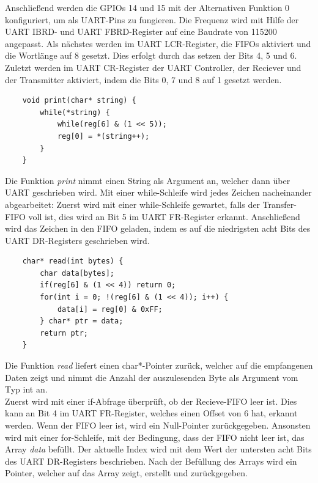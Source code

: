 \documentclass[12pt]{article}
\begin{document}
 Anschließend werden die GPIOs 14 und 15 mit der Alternativen Funktion 0 konfiguriert, um als UART-Pins zu fungieren. Die Frequenz wird mit Hilfe der UART IBRD- und UART FBRD-Register auf eine Baudrate von 115200 angepasst. Als nächstes werden im UART LCR-Register, die FIFOs aktiviert und die Wortlänge auf 8 gesetzt. Dies erfolgt durch das setzen der Bits 4, 5 und 6. Zuletzt werden im UART CR-Register der UART Controller, der Reciever und der Transmitter aktiviert, indem die Bits 0, 7 und 8 auf 1 gesetzt werden.\\
\begin{verbatim}
    void print(char* string) {
        while(*string) {
            while(reg[6] & (1 << 5));
            reg[0] = *(string++);
        }
    }
\end{verbatim}
\vspace{-2mm}
Die Funktion \textit{print} nimmt einen String als Argument an, welcher dann über UART geschrieben wird. Mit einer while-Schleife wird jedes Zeichen nacheinander abgearbeitet: Zuerst wird mit einer while-Schleife gewartet, falls der Transfer-FIFO voll ist, dies wird an Bit 5 im UART FR-Register erkannt. Anschließend wird das Zeichen in den FIFO geladen, indem es auf die niedrigsten acht Bits des UART DR-Registers geschrieben wird.\\
\begin{verbatim}
    char* read(int bytes) {
        char data[bytes];
        if(reg[6] & (1 << 4)) return 0;
        for(int i = 0; !(reg[6] & (1 << 4)); i++) {
            data[i] = reg[0] & 0xFF;
        } char* ptr = data;
        return ptr;
    }
\end{verbatim}
\vspace{-2mm}
Die Funktion \textit{read} liefert einen char*-Pointer zurück, welcher auf die empfangenen Daten zeigt und nimmt die Anzahl der auszulesenden Byte als Argument vom Typ int an.\\
Zuerst wird mit einer if-Abfrage überprüft, ob der Recieve-FIFO leer ist. Dies kann an Bit 4 im UART FR-Register, welches einen Offset von 6 hat, erkannt werden. Wenn der FIFO leer ist, wird ein Null-Pointer zurückgegeben. Ansonsten wird mit einer for-Schleife, mit der Bedingung, dass der FIFO nicht leer ist, das Array \textit{data} befüllt. Der aktuelle Index wird mit dem Wert der untersten acht Bits des UART DR-Registers beschrieben. Nach der Befüllung des Arrays wird ein Pointer, welcher auf das Array zeigt, erstellt und zurückgegeben.
\end{document}
